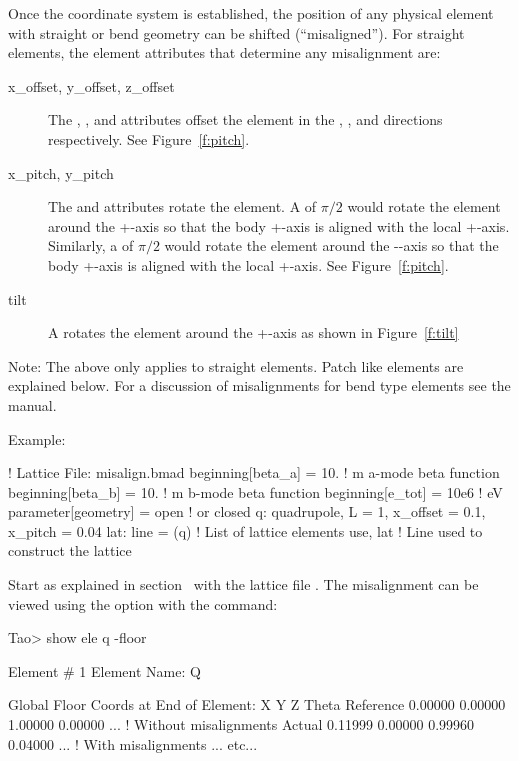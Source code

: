 \documentclass{hitec}
\begin{document}
Once the  coordinate system is established, the position of any physical element with
straight or bend geometry can be shifted (``misaligned''). For straight elements, the element attributes
that determine any misalignment are:
\begin{description}
\item[x_offset, y_offset, z_offset]
The , , and  attributes offset the element in the , ,
and  directions respectively. See Figure~\ref{f:pitch}.
\item[x_pitch, y_pitch]
The  and  attributes rotate the element. A  of $\pi/2$ would rotate the
element around the +-axis so that the body +-axis is aligned with the local
+-axis. Similarly, a  of $\pi/2$ would rotate the element around the --axis so
that the body +-axis is aligned with the local +-axis. See Figure~\ref{f:pitch}.
\item[tilt]
A  rotates the element around the +-axis as shown in Figure~\ref{f:tilt}
\end{description}

Note: The above only applies to straight elements. Patch like elements are explained below. For a
discussion of misalignments for bend type elements see the \bmad manual.

Example:
\begin{code}
! Lattice File: misalign.bmad
beginning[beta_a] = 10.   ! m  a-mode beta function
beginning[beta_b] = 10.   ! m  b-mode beta function
beginning[e_tot] = 10e6   ! eV
parameter[geometry] = open  ! or closed
q: quadrupole, L = 1, x_offset = 0.1, x_pitch = 0.04
lat: line = (q)   ! List of lattice elements
use, lat          ! Line used to construct the lattice
\end{code}

Start \tao as explained in section~ with the lattice file . The
misalignment can be viewed using the  option with the  command:
\begin{code} 
Tao> show ele q -floor

 Element #                1
 Element Name: Q

Global Floor Coords at End of Element:
                X        Y        Z    Theta  
Reference  0.00000  0.00000  1.00000  0.00000 ... ! Without misalignments
Actual     0.11999  0.00000  0.99960  0.04000 ... ! With misalignments
... etc...
\end{code}
\end{document}
